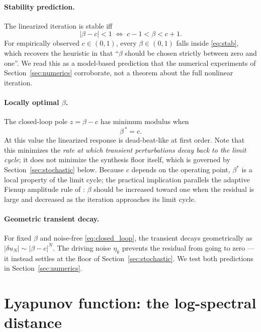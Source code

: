 \documentclass[11pt,a4paper]{article}
\begin{document}
\paragraph{Stability prediction.} The linearized iteration is stable iff
\begin{equation}
  \lvert\beta - c\rvert < 1
  \;\Longleftrightarrow\;
  c-1 < \beta < c+1.
  \label{eq:stab}
\end{equation}
For empirically observed $c\in(0,1)$, every $\beta\in(0,1)$ falls inside
\eqref{eq:stab}, which recovers the heuristic in \cite{Bernau2012} that
``$\beta$ should be chosen strictly between zero and one''. We
read this as a model-based prediction that the numerical experiments of
Section~\ref{sec:numerics} corroborate, not a theorem about the full
nonlinear iteration.

\paragraph{Locally optimal $\beta$.} The closed-loop pole $z=\beta-c$ has
minimum modulus when
\begin{equation}
  \boxed{\;\beta^{\,*} = c.\;}
\end{equation}
At this value the linearized response is dead-beat-like at first order. Note
that this minimizes the \emph{rate at which transient perturbations decay
back to the limit cycle}; it does not minimize the synthesis floor itself,
which is governed by Section~\ref{sec:stochastic} below. Because $c$ depends
on the operating point, $\beta^*$ is a local property of the limit cycle;
the practical implication parallels the adaptive Fienup amplitude rule of
\cite{Bernau2012}: $\beta$ should be increased toward one when the residual
is large and decreased as the iteration approaches its limit cycle.

\paragraph{Geometric transient decay.} For fixed $\beta$ and noise-free
\eqref{eq:closed_loop}, the transient decays geometrically as
$\lvert\delta u_N\rvert\sim\lvert\beta-c\rvert^N$. The driving noise $\eta_k$
prevents the residual from going to zero --- it instead settles at the floor
of Section~\ref{sec:stochastic}. We test both predictions in
Section~\ref{sec:numerics}.

\section{Lyapunov function: the log-spectral distance}\label{sec:lyapunov}
\end{document}
